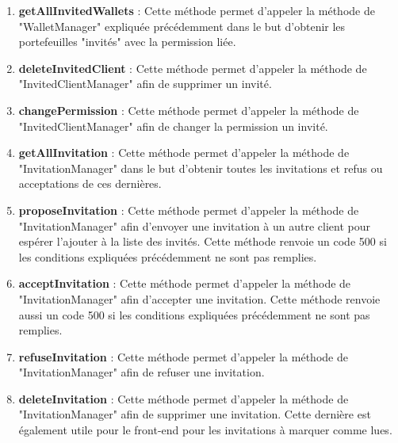 \begin{enumerate}
\item \textbf{getAllInvitedWallets} :\newline
Cette méthode permet d'appeler la méthode de "WalletManager" expliquée précédemment dans le but d'obtenir les portefeuilles "invités" avec la permission liée. 
\item \textbf{deleteInvitedClient} :\newline
Cette méthode permet d'appeler la méthode de "InvitedClientManager" afin de supprimer un invité. 
\item \textbf{changePermission} :\newline
Cette méthode permet d'appeler la méthode de "InvitedClientManager" afin de changer la permission un invité. 
\item \textbf{getAllInvitation} :\newline
Cette méthode permet d'appeler la méthode de "InvitationManager" dans le but d'obtenir toutes les invitations et refus ou acceptations de ces dernières. 
\item \textbf{proposeInvitation} :\newline
Cette méthode permet d'appeler la méthode de "InvitationManager" afin d'envoyer une invitation à un autre client pour espérer l'ajouter à la liste des invités. 
Cette méthode renvoie un code 500 si les conditions expliquées précédemment ne sont pas remplies.
\item \textbf{acceptInvitation} :\newline
Cette méthode permet d'appeler la méthode de "InvitationManager" afin d'accepter une invitation. 
Cette méthode renvoie aussi un code 500 si les conditions expliquées précédemment ne sont pas remplies.
\item \textbf{refuseInvitation} :\newline
Cette méthode permet d'appeler la méthode de "InvitationManager" afin de refuser une invitation. 
\item \textbf{deleteInvitation} :\newline
Cette méthode permet d'appeler la méthode de "InvitationManager" afin de supprimer une invitation. 
Cette dernière est également utile pour le front-end pour les invitations à marquer comme lues.
\end{enumerate}
